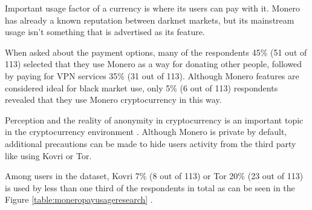 \documentclass[
  printed, %
  table,   %
  lof,     %
  lot,     %
           oneside, color
]{fithesis3}
\begin{document}
Important usage factor of a currency is where its users can pay with it. Monero has already a known reputation between darknet markets, but its mainstream usage isn't something that is advertised as its feature. 

When asked about the payment options, many of the respondents 45\% (51 out of 113) selected that they use Monero as a way for donating other people, followed by paying for VPN services 35\% (31 out of 113). Although Monero features are considered ideal for black market use, only 5\% (6 out of 113) respondents revealed that they use Monero cryptocurrency in this way.%

Perception and the reality of anonymity in cryptocurrency is an important topic in the cryptocurrency environment \cite{amarasinghe2019survey}. Although Monero is private by default, additional precautions can be made to hide users activity from the third party like using Kovri or Tor. 

Among users in the dataset, Kovri 7\% (8 out of 113) or Tor 20\% (23 out of 113) is used by less than one third of the respondents in total as can be seen in the Figure \ref{table:moneropayusageresearch} .
\end{document}
